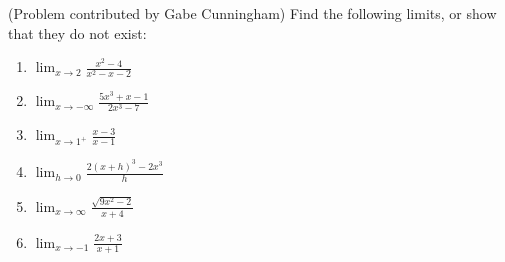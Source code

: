 (Problem contributed by Gabe Cunningham) Find the following limits, or show that they do not exist:
\begin{multicols}{2}
\begin{enumerate}
\item ${\displaystyle \lim_{x \to 2} \frac{x^2-4}{x^2-x-2}}$
\item ${\displaystyle \lim_{x \to -\infty} \frac{5x^3+x-1}{2x^3-7}}$
\item ${\displaystyle \lim_{x \to 1^{+}} \frac{x-3}{x-1}}$
\answer{$-\infty$}
\item ${\displaystyle \lim_{h \to 0} \frac{2(x+h)^3 - 2x^3}{h}}$
\item ${\displaystyle \lim_{x \to \infty} \frac{\sqrt{9x^2-2}}{x+4}}$
\item ${\displaystyle \lim_{x \to -1} \frac{2x+3}{x+1}}$
\end{enumerate}
\end{multicols}
